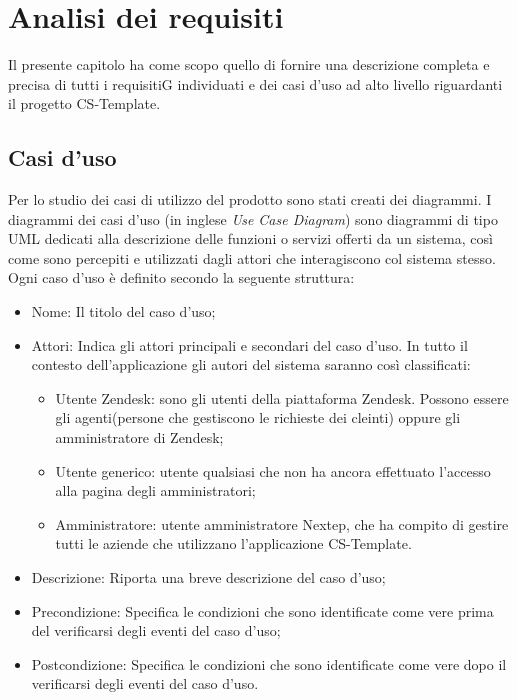 
\chapter{Analisi dei requisiti}
\label{cap:analisi-requisiti}
Il presente capitolo ha come scopo quello di fornire una descrizione completa e precisa di tutti i requisitiG individuati e dei casi d’uso ad alto livello riguardanti il progetto CS-Template.

\section{Casi d'uso}

Per lo studio dei casi di utilizzo del prodotto sono stati creati dei diagrammi.
I diagrammi dei casi d'uso (in inglese \emph{Use Case Diagram}) sono diagrammi di tipo \gls{UML} dedicati alla descrizione delle funzioni o servizi offerti da un sistema, così come sono percepiti e utilizzati dagli attori che interagiscono col sistema stesso.
Ogni caso d’uso è definito secondo la seguente struttura:
\begin{itemize}
	\item Nome: Il titolo del caso d’uso;
	\item Attori: Indica gli attori principali e secondari del caso d’uso. In tutto il contesto
	dell’applicazione gli autori del sistema saranno così classificati:
	\begin{itemize}
		\item Utente Zendesk: sono gli utenti della piattaforma Zendesk. Possono essere gli agenti(persone che gestiscono le richieste dei cleinti) oppure gli amministratore di Zendesk;
		\item Utente generico: utente qualsiasi che non ha ancora effettuato l'accesso alla pagina degli amministratori;
		 \item Amministratore: utente amministratore Nextep, che ha compito di gestire tutti le aziende che utilizzano l'applicazione CS-Template.
	\end{itemize}

	\item Descrizione: Riporta una breve descrizione del caso d’uso;
	\item Precondizione: Specifica le condizioni che sono identificate come vere prima
	del verificarsi degli eventi del caso d’uso;
	\item Postcondizione: Specifica le condizioni che sono identificate come vere dopo il
	verificarsi degli eventi del caso d’uso.

\end{itemize}

